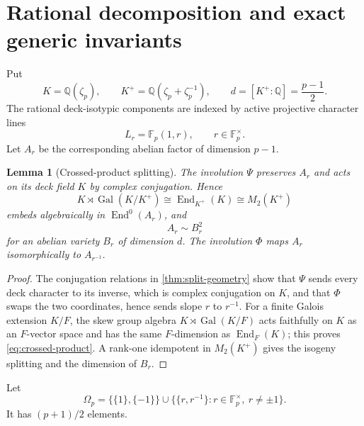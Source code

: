 \documentclass[11pt]{article}
\newtheorem{lemma}[theorem]{Lemma}
\theoremstyle{definition}
\theoremstyle{remark}
\newcommand{\Q}{\mathbb Q}
\newcommand{\F}{\mathbb F}
\newcommand{\End}{\operatorname{End}}
\newcommand{\Gal}{\operatorname{Gal}}
\begin{document}
\section{Rational decomposition and exact generic invariants}

Put
\[
 K=\Q(\zeta_p),\qquad
 K^+=\Q(\zeta_p+\zeta_p^{-1}),\qquad
 d=[K^+:\Q]=\frac{p-1}{2}.
\]
The rational deck-isotypic components are indexed by active projective character lines
\[
 L_r=\F_p(1,r),\qquad r\in\F_p^\times.
\]
Let $A_r$ be the corresponding abelian factor of dimension $p-1$.

\begin{lemma}[Crossed-product splitting]\label{lem:crossed-product}
The involution $\Psi$ preserves $A_r$ and acts on its deck field $K$ by complex conjugation.  Hence
\begin{equation}\label{eq:crossed-product}
 K\rtimes\Gal(K/K^+)
 \cong\End_{K^+}(K)
 \cong M_2(K^+)
\end{equation}
embeds algebraically in $\End^0(A_r)$, and
\[
 A_r\sim B_r^2
\]
for an abelian variety $B_r$ of dimension $d$.  The involution $\Phi$ maps $A_r$ isomorphically to $A_{r^{-1}}$.
\end{lemma}

\begin{proof}
The conjugation relations in \cref{thm:split-geometry} show that $\Psi$ sends every deck character to its inverse, which is complex conjugation on $K$, and that $\Phi$ swaps the two coordinates, hence sends slope $r$ to $r^{-1}$.  For a finite Galois extension $K/F$, the skew group algebra $K\rtimes\Gal(K/F)$ acts faithfully on $K$ as an $F$-vector space and has the same $F$-dimension as $\End_F(K)$; this proves \eqref{eq:crossed-product}.  A rank-one idempotent in $M_2(K^+)$ gives the isogeny splitting and the dimension of $B_r$.
\end{proof}

Let
\begin{equation}\label{eq:Omega-p}
 \Omega_p=
 \bigl\{\{1\},\{-1\}\bigr\}
 \cup
 \bigl\{\{r,r^{-1}\}:r\in\F_p^\times,\ r\ne\pm1\bigr\}.
\end{equation}
It has $(p+1)/2$ elements.
\end{document}
